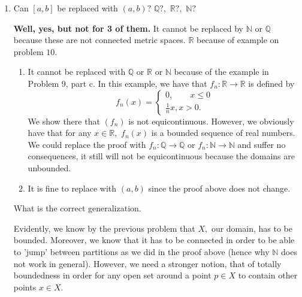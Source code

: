 \documentclass[11pt]{article}
\newcommand{\bbN}{\mathbb{N}}
\newcommand{\bbQ}{\mathbb{Q}}
\newcommand{\bbR}{\mathbb{R}}
\begin{document}
\begin{enumerate}
\begin{solution}
\end{solution}
\item 
\begin{problem}
    Can $[a,b]$ be replaced with $(a,b)?$ $\bbQ?,$ $\bbR?,$ $\bbN?$
\end{problem}
\begin{solution}
    \textbf{Well, yes, but not for 3 of them.} It cannot be replaced by $\bbN$ or $\bbQ$ because these are not connected metric spaces. $\bbR$ because of example on problem $10.$
    \begin{enumerate}
        \item It cannot be replaced with $\bbQ$ or $\bbR$ or $\bbN$ because of the example in Problem 9, part c. In this example, we have that $f_n: \bbR \to \bbR$ is defined by 
        \[f_n(x) = \begin{cases}
            0, \qquad x\leq 0\\
            \frac{1}{n}x, x >0.
        \end{cases}\]
        We show there that $(f_n)$ is not equicontinuous. However, we obviously have that for any $x\in \bbR,$ $f_n(x)$ is a bounded sequence of real numbers. We could replace the proof with $f_n: \bbQ \to \bbQ$ or $f_n: \bbN \to \bbN$ and suffer no consequences, it still will not be equicontinuous because the domains are unbounded.
        \item It is fine to replace with $(a,b)$ since the proof above does not change.
    \end{enumerate}
\end{solution}
\begin{problem}
    What is the correct generalization.
\end{problem}
\begin{solution}
Evidently, we know by the previous problem that $X,$ our domain, has to be bounded. Moreover, we know that it has to be connected in order to be able to 'jump' between partitions as we did in the proof above (hence why $\bbN$ does not work in general). However, we need a stronger notion, that of totally boundedness in order for any open set around a point $p \in X$ to contain other points $x\in X.$
\end{solution}
\end{enumerate}

\newpage
\end{document}
